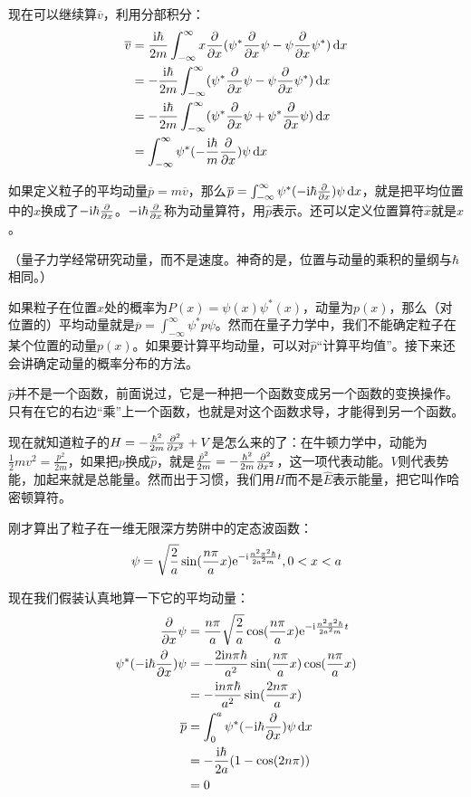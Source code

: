 现在可以继续算$\overline{v}$，利用分部积分：
\begin{align*}
\overline{v}&=\frac{\mathrm{i} \hbar}{2 m} \int_{-\infty}^{\infty} x \frac{\partial}{\partial x}(\psi^* \frac{\partial}{\partial x} \psi-\psi \frac{\partial}{\partial x} \psi^*) \mathop{}\!\mathrm{d} x \\
&=-\frac{\mathrm{i} \hbar}{2 m} \int_{-\infty}^{\infty} (\psi^* \frac{\partial}{\partial x} \psi-\psi \frac{\partial}{\partial x} \psi^*) \mathop{}\!\mathrm{d} x \\
&=-\frac{\mathrm{i} \hbar}{2 m} \int_{-\infty}^{\infty} (\psi^* \frac{\partial}{\partial x} \psi+\psi^* \frac{\partial}{\partial x} \psi) \mathop{}\!\mathrm{d} x \\
&=\int_{-\infty}^{\infty} \psi^* (-\frac{\mathrm{i} \hbar}{m} \frac{\partial}{\partial x}) \psi \mathop{}\!\mathrm{d} x
\end{align*}

如果定义粒子的平均动量$\overline{p}=m \overline{v}$，那么$\overline{p}=\int_{-\infty}^{\infty} \psi^* (-\mathrm{i} \hbar \frac{\partial}{\partial x}) \psi \mathop{}\!\mathrm{d} x$，就是把平均位置中的$x$换成了$-\mathrm{i} \hbar \frac{\partial}{\partial x}$。$-\mathrm{i} \hbar \frac{\partial}{\partial x}$称为动量算符，用$\hat{p}$表示。还可以定义位置算符$\hat{x}$就是$x$。

（量子力学经常研究动量，而不是速度。神奇的是，位置与动量的乘积的量纲与$\hbar$相同。）

如果粒子在位置$x$处的概率为$P(x)=\psi(x) \psi^*(x)$，动量为$p(x)$，那么（对位置的）平均动量就是$\overline{p}=\int_{-\infty}^{\infty} \psi^* p \psi$。然而在量子力学中，我们不能确定粒子在某个位置的动量$p(x)$。如果要计算平均动量，可以对$\hat{p}$“计算平均值”。接下来还会讲确定动量的概率分布的方法。

$\hat{p}$并不是一个函数，前面说过，它是一种把一个函数变成另一个函数的变换操作。只有在它的右边“乘”上一个函数，也就是对这个函数求导，才能得到另一个函数。

现在就知道粒子的$H=-\frac{\hbar^2}{2 m} \frac{\partial^{2}}{\partial x^{2}}+V$是怎么来的了：在牛顿力学中，动能为$\frac{1}{2} m v^2=\frac{p^2}{2 m}$，如果把$p$换成$\hat{p}$，就是$\frac{\hat{p}^2}{2 m}=-\frac{\hbar^2}{2 m} \frac{\partial^{2}}{\partial x^{2}}$，这一项代表动能。$V$则代表势能，加起来就是总能量。然而出于习惯，我们用$H$而不是$\hat{E}$表示能量，把它叫作哈密顿算符。

刚才算出了粒子在一维无限深方势阱中的定态波函数：
\begin{equation*}
\psi=\sqrt{\frac{2}{a}} \sin(\frac{n \pi}{a} x) \mathrm{e}^{-\mathrm{i} \frac{n^2 \pi^2 \hbar}{2 a^2 m} t}, 0<x<a
\end{equation*}

现在我们假装认真地算一下它的平均动量：
\begin{align*}
\frac{\partial}{\partial x} \psi&=\frac{n \pi}{a} \sqrt{\frac{2}{a}} \cos(\frac{n \pi}{a} x) \mathrm{e}^{-\mathrm{i} \frac{n^2 \pi^2 \hbar}{2 a^2 m} t} \\
\psi^* (-\mathrm{i} \hbar \frac{\partial}{\partial x}) \psi&=-\frac{2 \mathrm{i} n \pi \hbar}{a^2} \sin(\frac{n \pi}{a} x) \cos(\frac{n \pi}{a} x) \\
&=-\frac{\mathrm{i} n \pi \hbar}{a^2} \sin(\frac{2 n \pi}{a} x) \\
\overline{p}&=\int_{0}^{a} \psi^* (-\mathrm{i} \hbar \frac{\partial}{\partial x}) \psi \mathop{}\!\mathrm{d} x \\
&=-\frac{\mathrm{i} \hbar}{2 a}(1-\cos(2 n \pi)) \\
&=0
\end{align*}

